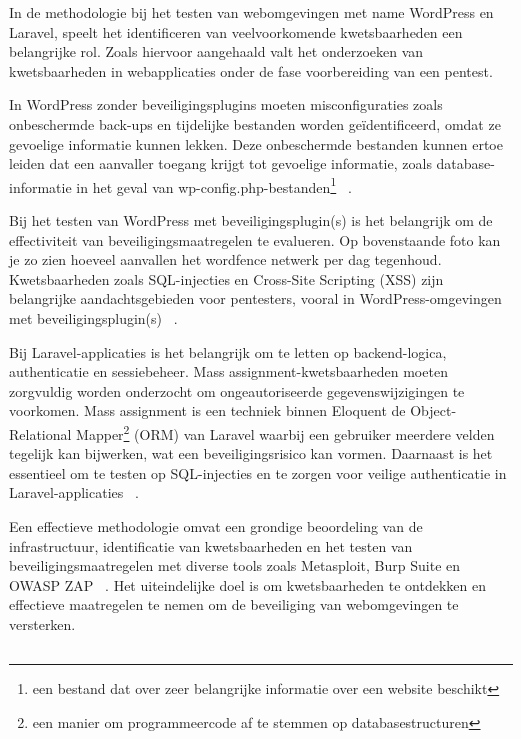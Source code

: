 In de methodologie bij het testen van webomgevingen met name WordPress en Laravel, speelt het identificeren van veelvoorkomende 
kwetsbaarheden een belangrijke rol. Zoals hiervoor aangehaald valt het onderzoeken van kwetsbaarheden in webapplicaties onder 
de fase voorbereiding van een pentest.

In WordPress zonder beveiligingsplugins moeten misconfiguraties zoals onbeschermde back-ups 
en tijdelijke bestanden worden geïdentificeerd, omdat ze gevoelige informatie kunnen lekken. Deze onbeschermde bestanden kunnen 
ertoe leiden dat een aanvaller toegang krijgt tot gevoelige informatie, zoals database-informatie in het geval van 
wp-config.php-bestanden\footnote{een bestand dat over zeer belangrijke informatie over een website beschikt} 
~\autocite{DalalanaBertoglio2017}.

Bij het testen van WordPress met beveiligingsplugin(s) is het belangrijk om de effectiviteit van beveiligingsmaatregelen te 
evalueren. Op bovenstaande foto kan je zo zien hoeveel aanvallen het wordfence netwerk per dag tegenhoud. Kwetsbaarheden 
zoals SQL-injecties en Cross-Site Scripting (XSS) zijn belangrijke aandachtsgebieden voor pentesters, vooral in WordPress-omgevingen 
met beveiligingsplugin(s) ~\autocite{Albahar2022}.

Bij Laravel-applicaties is het belangrijk om te letten op backend-logica, authenticatie en sessiebeheer. 
Mass assignment-kwetsbaarheden moeten zorgvuldig worden onderzocht om ongeautoriseerde gegevenswijzigingen te voorkomen.
Mass assignment is een techniek binnen Eloquent de Object-Relational Mapper\footnote{een manier om programmeercode af 
te stemmen op databasestructuren} (ORM) van Laravel  waarbij een gebruiker meerdere velden tegelijk kan bijwerken, wat een beveiligingsrisico kan vormen. 
Daarnaast is het essentieel om te testen op SQL-injecties en te zorgen voor veilige authenticatie in Laravel-applicaties 
~\autocite{Altulaihan2023}.

Een effectieve methodologie omvat een grondige beoordeling van de infrastructuur, identificatie van kwetsbaarheden en het 
testen van beveiligingsmaatregelen met diverse tools zoals Metasploit, Burp Suite en OWASP ZAP ~\autocite{Ravindran2022}. 
Het uiteindelijke doel is om kwetsbaarheden te ontdekken en effectieve maatregelen te nemen om de beveiliging van webomgevingen 
te versterken.

\subsection{}
\label{sec:Veiligheidskwetsbaarheden in Webomgevingen}

